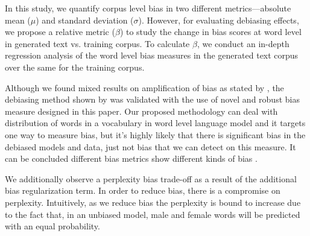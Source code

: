 \documentclass[11pt,a4paper]{article}
\newcommand{\note}[4][]{\todo[author=#2,color=#3,size=\scriptsize,fancyline,caption={},#1]{#4}} %
\newcommand{\phu}[2][]{\note[#1]{Phu}{violet!40}{#2}}
\newcommand{\sam}[2][]{\note[#1]{Sam}{orange!40}{#2}}
\begin{document}

In this study, we quantify corpus level bias in two different metrics---absolute mean ($\mu$) and standard deviation ($\sigma$). However, for evaluating debiasing effects, we propose a relative metric ($\beta$) to study the change in bias scores at word level in generated text vs. training corpus. To calculate $\beta$, we conduct an in-depth regression analysis of the word level bias measures in the generated text corpus over the same for the training corpus.


Although we found mixed results on amplification of bias as stated by \citet{Zhao2017men}, the debiasing method shown by \citet{bolukbasi2016man} was validated with the use of novel and robust bias measure designed in this paper. Our proposed methodology  can deal with distribution of words in a vocabulary in word level language model and it targets one way to measure bias, but it's highly likely that there is significant bias in the debiased models and data, just not bias that we can detect on this measure. It can be concluded different bias metrics  show different kinds of bias \citep{Gonen2019}.

We additionally observe a perplexity bias trade-off as a result of the additional bias regularization term. In order to reduce bias, there is a compromise on perplexity. Intuitively, as we reduce bias the perplexity is bound to increase due to the fact that, in an unbiased model, male and female words will be predicted with an equal probability.  



\end{document}
